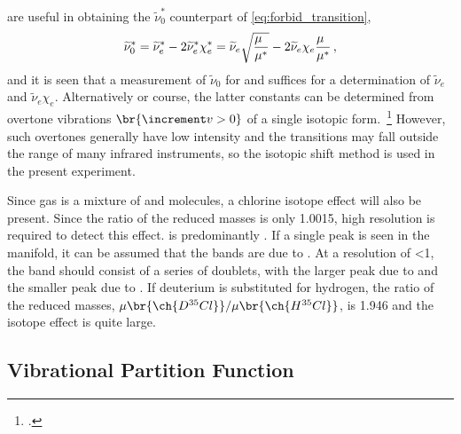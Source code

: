  are useful in obtaining the \( \widetilde{\nu}_0^* \) counterpart of \cref{eq:forbid_transition},
\begin{equation}
	\widetilde{\nu}_0^* = \widetilde{\nu}_e^* - 2\widetilde{\nu}_e^* \chi_e^* = \widetilde{\nu}_e \sqrt{\frac{\mu\hphantom{^*}}{\mu^*}} - 2 \widetilde{\nu}_e \chi_e \frac{\mu\hphantom{^*}}{\mu^*} \, ,
	\label{eq:forbidden_isotope_transition} 
\end{equation}
and it is seen that a measurement of \( \widetilde{\nu}_0 \) for  and  suffices for a determination of \( \widetilde{\nu}_e \) and \( \widetilde{\nu}_e \chi_e \). 
Alternatively or course, the latter constants can be determined from overtone vibrations \( \br{\increment v > 0} \) of a single isotopic form.~\Footcite[See Exp. 39 in][]{nibler14} 
However, such overtones generally have low intensity and the transitions may fall outside the range of many infrared instruments, so the isotopic shift method is used in the present experiment. 

Since  gas is a mixture of  and  molecules, a chlorine isotope effect will also be present. 
Since the ratio of the reduced masses is only \num{1.0015}, high resolution is required to detect this effect. 
 is predominantly . 
If a single peak is seen in the  manifold, it can be assumed that the bands are due to . 
At a resolution of \qty{<1}{\wn}, the band should consist of a series of doublets, with the larger peak due to  and the smaller peak due to .
If deuterium is substituted for hydrogen, the ratio of the reduced masses, \( \mu\br{\ch{D^{35}Cl}} / \mu\br{\ch{H^{35}Cl}} \), is \num{1.946} and the isotope effect is quite large. 


\subsection[Vibrational Partition Function]{Vibrational Partition Function~\autocite{levine95,mcquarrie73,lewis61}} %
\label{sub:vibrational_partition_function}

